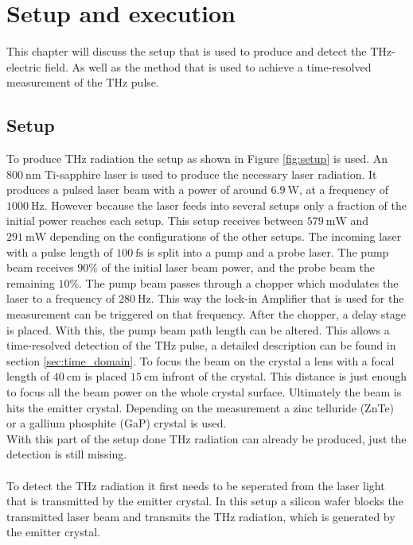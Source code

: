 \chapter{Setup and execution}
This chapter will discuss the setup that is used to produce and detect the $\si{\tera\hertz}$-electric field.
As well as the method that is used to achieve a time-resolved measurement of the $\si{\tera\hertz}$ pulse.

\section{Setup}
\label{sec:setup}
To produce $\si{\tera\hertz}$ radiation the setup as shown in Figure \ref{fig:setup} is used.
An $\SI{800}{\nano\meter}$ Ti-sapphire laser is used to produce the necessary laser radiation.
It produces a pulsed laser beam with a power of around $\SI{6.9}{\W}$, at a frequency of $\SI{1000}{\Hz}$.
However because the laser feeds into several setups only a fraction of the initial power reaches each setup.
This setup receives between $\SI{579}{\milli\W}$ and $\SI{291}{\milli\W}$ depending on the configurations of the other setups. 
The incoming laser with a pulse length of $\SI{100}{\femto\second}$ is split into a pump and a probe laser.
The pump beam receives $90\%$ of the initial laser beam power, and the probe beam the remaining $10\%$.
The pump beam passes through a chopper which modulates the laser to a frequency of $\SI{280}{\hertz}$.
This way the lock-in Amplifier that is used for the measurement can be triggered on that frequency.
After the chopper, a delay stage is placed.
With this, the pump beam path length can be altered.
This allows a time-resolved detection of the $\si{\tera\hertz}$ pulse, a detailed description can be found in section \ref{sec:time_domain}.
To focus the beam on the crystal a lens with a focal length of $\SI{40}{\centi\meter}$ is placed $\SI{15}{\centi\meter}$ infront of the crystal.
This distance is just enough to focus all the beam power on the whole crystal surface.
Ultimately the beam is hits the emitter crystal.
Depending on the measurement a zinc telluride (ZnTe) or a gallium phosphite (GaP) crystal is used.
\\
With this part of the setup done $\si{\tera\hertz}$ radiation can already be produced, just the detection is still missing.
\\\\
To detect the $\si{\tera\hertz}$ radiation it first needs to be seperated from the laser light that is transmitted by the emitter crystal.
In this setup a silicon wafer blocks the transmitted laser beam and transmits the $\si{\tera\hertz}$ radiation, which is generated by the emitter crystal.
